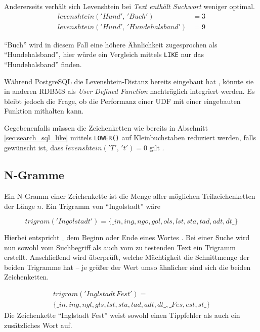 Andererseits verhält sich Levenshtein bei \emph{Text enthält Suchwort} weniger optimal.
\begin{equation}
\begin{aligned}
	levenshtein('Hund',\,'Buch') & = 3 \\
	levenshtein('Hund',\,'Hundehalsband') & = 9
\end{aligned}
\end{equation}

\enquote{Buch} wird in diesem Fall eine höhere Ähnlichkeit zugesprochen als \enquote{Hundehalsband}, hier würde ein Vergleich mittels \texttt{LIKE} nur das \enquote{Hundehalsband} finden.


Während PostgreSQL die Levenshtein-Distanz bereits eingebaut hat \cite[S. 38]{Redmond.2012}, könnte sie in anderen RDBMS als \emph{User Defined Function} nachträglich integriert werden. Es bleibt jedoch die Frage, ob die Performanz einer UDF mit einer eingebauten Funktion mithalten kann.

Gegebenenfalls müssen die Zeichenketten wie bereits in Abschnitt \ref{sec:search_sql_like} mittels \texttt{LOWER()} auf Kleinbuchstaben reduziert werden, falls gewünscht ist, dass $levenshtein('T',\,'t') = 0$ gilt \cite[S. 38]{Redmond.2012}.


\subsection{N-Gramme}

Ein N-Gramm einer Zeichenkette ist die Menge aller möglichen Teilzeichenketten der Länge $n$. Ein Trigramm von \enquote{Ingolstadt} wäre

\begin{equation}
trigram('Ingolstadt') = \{\_in, ing, ngo, gol, ols, lst, sta, tad, adt, dt\_\}
\end{equation}

Hierbei entspricht $\_$ dem Beginn oder Ende eines Wortes \cite[S. 92f]{Buttcher.2010}. Bei einer Suche wird nun sowohl vom Suchbegriff als auch vom zu testenden Text ein Trigramm erstellt. Anschließend wird überprüft, welche Mächtigkeit die Schnittmenge der beiden Trigramme hat -- je größer der Wert umso ähnlicher sind sich die beiden Zeichenketten.

\begin{equation}
\begin{aligned}
trigram('Inglstadt\,Fest') = \\ \{\_in, ing, ngl, gls, lst, sta, tad, adt, dt\_, \_Fes, est, st\_\}
\end{aligned}
\end{equation}
Die Zeichenkette \enquote{Inglstadt Fest} weist sowohl einen Tippfehler als auch ein zusätzliches Wort auf.

